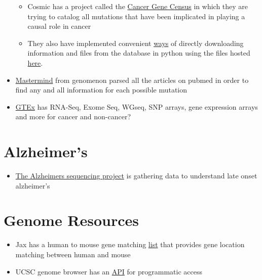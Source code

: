 \documentclass[]{book}
\providecommand{\tightlist}{%
  \setlength{\itemsep}{0pt}\setlength{\parskip}{0pt}}
\begin{document}
\begin{itemize}
  \begin{itemize}
  \tightlist
  \item
    Cosmic has a project called the
    \href{https://cancer.sanger.ac.uk/cosmic/census?genome=37}{Cancer
    Gene Census} in which they are trying to catalog all mutations that
    have been implicated in playing a causal role in cancer
  \item
    They also have implemented convenient
    \href{https://cancer.sanger.ac.uk/cosmic/help/file_download}{ways}
    of directly downloading information and files from the database in
    python using the files hosted
    \href{https://cancer.sanger.ac.uk/cosmic/download}{here}.
  \end{itemize}
\item
  \href{https://mastermind.genomenon.com/api}{Mastermind} from genomenon
  parsed all the articles on pubmed in order to find any and all
  information for each possible mutation
\item
  \href{https://gtexportal.org/home/}{GTEx} has RNA-Seq, Exome Seq,
  WGseq, SNP arrays, gene expression arrays and more for cancer and
  non-cancer?
\end{itemize}

\section{Alzheimer's}\label{alzheimers}

\begin{itemize}
\tightlist
\item
  \href{https://www.niagads.org/adsp/content/home}{The Alzheimers
  sequencing project} is gathering data to understand late onset
  alzheimer's
\end{itemize}

\section{Genome Resources}\label{genome-resources}

\begin{itemize}
\tightlist
\item
  Jax has a human to mouse gene matching
  \href{http://www.informatics.jax.org/downloads/reports/HOM_MouseHumanSequence.rpt}{list}
  that provides gene location matching between human and mouse
\item
  UCSC genome browser has an
  \href{http://genomewiki.ucsc.edu/index.php/Programmatic_access_to_the_Genome_Browser}{API}
  for programmatic access
\end{itemize}
\end{document}
